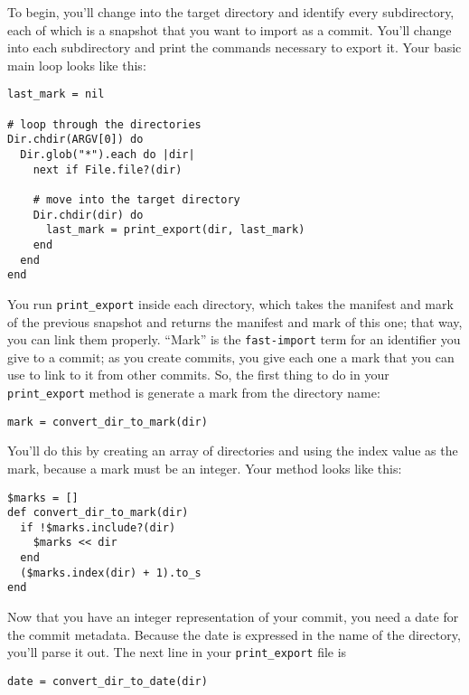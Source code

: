 \documentclass[a4paper]{book}
\begin{document}
To begin, you'll change into the target directory and identify every subdirectory, each of which is a snapshot that you want to import as a commit. You'll change into each subdirectory and print the commands necessary to export it. Your basic main loop looks like this:

\begin{shaded}\begin{verbatim}
last_mark = nil

# loop through the directories
Dir.chdir(ARGV[0]) do
  Dir.glob("*").each do |dir|
    next if File.file?(dir)

    # move into the target directory
    Dir.chdir(dir) do
      last_mark = print_export(dir, last_mark)
    end
  end
end
\end{verbatim}\end{shaded}

You run \texttt{print\_export} inside each directory, which takes the manifest and mark of the previous snapshot and returns the manifest and mark of this one; that way, you can link them properly. “Mark” is the \texttt{fast-import} term for an identifier you give to a commit; as you create commits, you give each one a mark that you can use to link to it from other commits. So, the first thing to do in your \texttt{print\_export} method is generate a mark from the directory name:

\begin{shaded}\begin{verbatim}
mark = convert_dir_to_mark(dir)
\end{verbatim}\end{shaded}

You'll do this by creating an array of directories and using the index value as the mark, because a mark must be an integer. Your method looks like this:

\begin{shaded}\begin{verbatim}
$marks = []
def convert_dir_to_mark(dir)
  if !$marks.include?(dir)
    $marks << dir
  end
  ($marks.index(dir) + 1).to_s
end
\end{verbatim}\end{shaded}

Now that you have an integer representation of your commit, you need a date for the commit metadata. Because the date is expressed in the name of the directory, you'll parse it out. The next line in your \texttt{print\_export} file is

\begin{shaded}\begin{verbatim}
date = convert_dir_to_date(dir)
\end{verbatim}\end{shaded}
\end{document}
